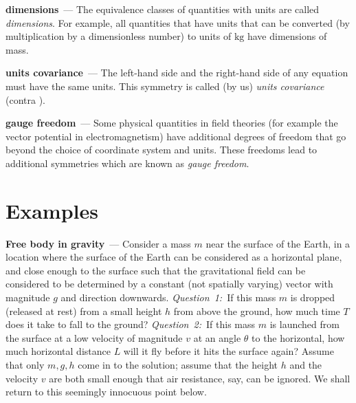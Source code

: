 \documentclass{article}
\newcommand{\unit}[1]{\mathrm{#1}}
\newcommand{\kg}{\unit{kg}}
\renewcommand{\paragraph}[1]{\par\textbf{#1}~---}
\begin{document}
\paragraph{dimensions}
The equivalence classes of quantities with units are called \emph{dimensions}.
For example, all quantities that have units that can be converted (by multiplication by a dimensionless number) to units of $\kg$ have dimensions of mass.

\paragraph{units covariance}
The left-hand side and the right-hand side of any equation must have the same units.
This symmetry is called (by us) \emph{units covariance} (contra \cite{villar2022dimensionless}).

\paragraph{gauge freedom}
Some physical quantities in field theories (for example the vector potential in electromagnetism) have additional degrees of freedom that go beyond the choice of coordinate system and units.
These freedoms lead to additional symmetries which are known as \emph{gauge freedom}.

\section{Examples}

\paragraph{Free body in gravity}
Consider a mass $m$ near the surface of the Earth, in a location where the surface of the Earth can be considered as a horizontal plane, and close enough to the surface such that the gravitational field can be considered to be determined by a constant (not spatially varying) vector with magnitude $g$ and direction downwards.
\textsl{Question~1:}~If this mass $m$ is dropped (released at rest) from a small height $h$ from above the ground, how much time $T$ does it take to fall to the ground?
\textsl{Question~2:}~If this mass $m$ is launched from the surface at a low velocity of magnitude $v$ at an angle $\theta$ to the horizontal, how much horizontal distance $L$ will it fly before it hits the surface again?
Assume that only $m, g, h$ come in to the solution; assume that the height $h$ and the velocity $v$ are both small enough that air resistance, say, can be ignored. We shall return to this seemingly innocuous point below.
\end{document}
